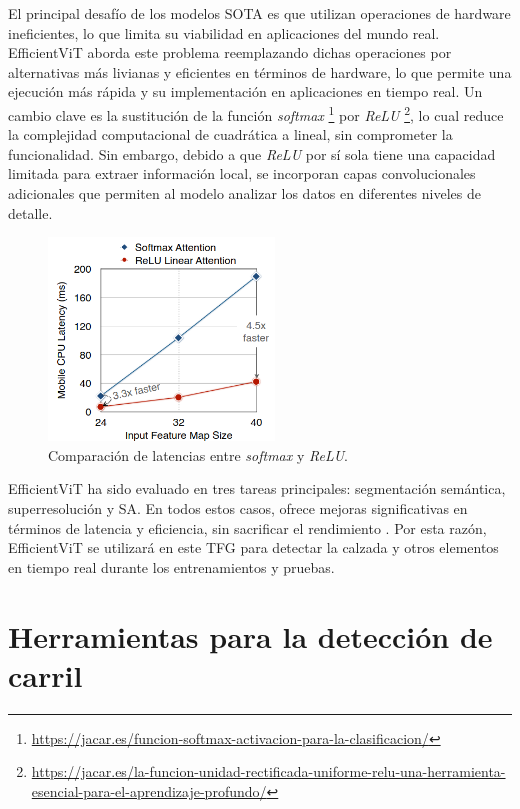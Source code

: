 El principal desafío de los modelos \ac{SOTA} es que utilizan operaciones de hardware ineficientes, lo que limita su viabilidad en aplicaciones del mundo real. EfficientViT aborda este problema reemplazando dichas operaciones por alternativas más livianas y eficientes en términos de hardware, lo que permite una ejecución más rápida y su implementación en aplicaciones en tiempo real. Un cambio clave es la sustitución de la función \textit{softmax} \footnote{\url{https://jacar.es/funcion-softmax-activacion-para-la-clasificacion/}} por \textit{ReLU} \footnote{\url{https://jacar.es/la-funcion-unidad-rectificada-uniforme-relu-una-herramienta-esencial-para-el-aprendizaje-profundo/}}, lo cual reduce la complejidad computacional de cuadrática a lineal, sin comprometer la funcionalidad. Sin embargo, debido a que \textit{ReLU} por sí sola tiene una capacidad limitada para extraer información local, se incorporan capas convolucionales adicionales que permiten al modelo analizar los datos en diferentes niveles de detalle. 

\begin{figure}[ht]
  \begin{center}
    \includegraphics[width=6cm]{figs/Plataformas_Desarollo/time.png}
  \end{center}
  \caption{Comparación de latencias entre \textit{softmax} y \textit{ReLU}.}
  \label{foto_eff}
\end{figure}

EfficientViT ha sido evaluado en tres tareas principales: segmentación semántica, superresolución y \ac{SA}. En todos estos casos, ofrece mejoras significativas en términos de latencia y eficiencia, sin sacrificar el rendimiento \cite{efficientvit}. Por esta razón, EfficientViT se utilizará en este \ac{TFG} para detectar la calzada y otros elementos en tiempo real durante los entrenamientos y pruebas.

\section{Herramientas para la detección de carril}
\label{sec:herr}
